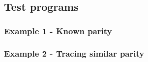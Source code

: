 \newpage
\subsection*{Test programs}
\subsubsection*{Example 1 - Known parity}
\subsubsection*{Example 2 - Tracing similar parity}

